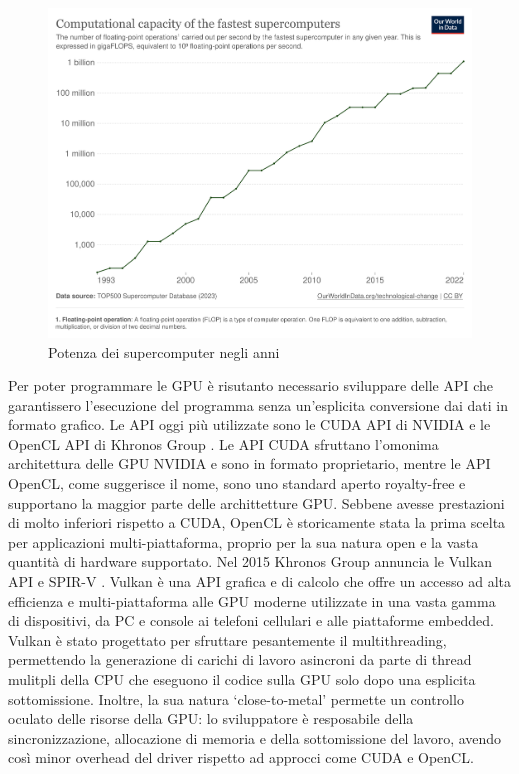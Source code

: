 \begin{figure}[ht]
\centering
\includegraphics[width=.9\linewidth]{images/chapter1/supercomputer_flops.png}
\caption{Potenza dei supercomputer negli anni}
\label{fig:supercomputer_flops}
\end{figure}
    

Per poter programmare le GPU è risutanto necessario sviluppare delle \gls{API} che garantissero l'esecuzione del programma senza un'esplicita conversione dai dati in formato grafico. Le API oggi più utilizzate sono le \gls{CUDA} API di NVIDIA \cite[]{NVIDIA:CUDA} e le OpenCL API di Khronos Group \cite[]{KG:OpenCL}. Le API CUDA sfruttano l'omonima architettura delle GPU NVIDIA e sono in formato proprietario, mentre le API OpenCL, come suggerisce il nome, sono uno standard aperto royalty-free e supportano la maggior parte delle archittetture GPU. Sebbene avesse prestazioni di molto inferiori rispetto a CUDA, OpenCL è storicamente stata la prima scelta per applicazioni multi-piattaforma, proprio per la sua natura open e la vasta quantità di hardware supportato. Nel 2015 Khronos Group annuncia le Vulkan API \cite[]{KG:Vulkan} e SPIR-V \cite[]{KG:SPIR-V}. Vulkan è una API grafica e di calcolo che offre un accesso ad alta efficienza e multi-piattaforma alle GPU moderne utilizzate in una vasta gamma di dispositivi, da PC e console ai telefoni cellulari e alle piattaforme embedded. Vulkan è stato progettato per sfruttare pesantemente il multithreading, permettendo la generazione di carichi di lavoro asincroni da parte di thread mulitpli della CPU che eseguono il codice sulla GPU solo dopo una esplicita sottomissione. Inoltre, la sua natura `close-to-metal' permette un controllo oculato delle risorse della GPU: lo sviluppatore è resposabile della sincronizzazione, allocazione di memoria e della sottomissione del lavoro, avendo così minor overhead del driver rispetto ad approcci come CUDA e OpenCL.

